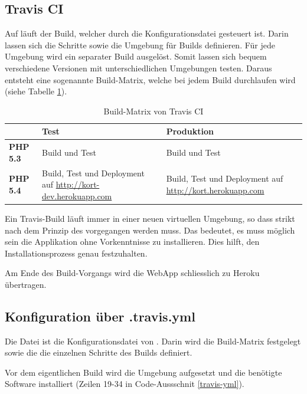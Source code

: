 \subsection{Travis CI}
Auf  läuft der Build, welcher durch die Konfigurationsdatei  gesteuert ist. Darin lassen sich die Schritte sowie die Umgebung für Builds definieren.
Für jede Umgebung wird ein separater Build ausgelöst.
Somit lassen sich bequem verschiedene Versionen mit unterschiedlichen Umgebungen testen.
Daraus entsteht eine sogenannte Build-Matrix, welche bei jedem Build durchlaufen wird (siehe Tabelle \ref{infrastruktur-build-matrix}).

\begin{table}[H]
\centering
\begin{tabular}{|p{0.15\threecelltabwidth}|p{0.425\threecelltabwidth}|p{0.425\threecelltabwidth}|}
\hline 
 & \textbf{Test} & \textbf{Produktion} \\
\hline 
\textbf{PHP 5.3} & Build und Test & Build und Test \\
\hline 
\textbf{PHP 5.4} & Build, Test und Deployment auf \url{http://kort-dev.herokuapp.com} & Build, Test und Deployment auf \url{http://kort.herokuapp.com} \\
\hline 
\end{tabular} 
\caption{Build-Matrix von Travis CI}
\label{infrastruktur-build-matrix}
\end{table}

Ein Travis-Build läuft immer in einer neuen virtuellen Umgebung, so dass strikt nach dem Prinzip des \emph{} vorgegangen werden muss.
Das bedeutet, es muss möglich sein die Applikation ohne Vorkenntnisse zu installieren.
Dies hilft, den Installationsprozess genau festzuhalten.

Am Ende des Build-Vorgangs wird die \gls{WebApp} schliesslich zu Heroku übertragen.

\subsection{Konfiguration über .travis.yml}
Die  Datei ist die Konfigurationsdatei von .
Darin wird die Build-Matrix festgelegt sowie die die einzelnen Schritte des Builds definiert.

Vor dem eigentlichen Build wird die Umgebung aufgesetzt und die benötigte Software installiert (Zeilen 19-34 in Code-Aussschnit \ref{travis-yml}).


